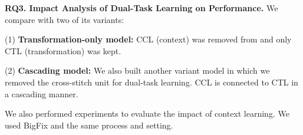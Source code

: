 



\vspace{2pt}
{\bf RQ3. Impact Analysis of Dual-Task Learning on Performance.}
We compare {\tool} with two of its variants:

(1) \textbf{Transformation-only model:}
CCL (context) was removed from {\tool} and only CTL (transformation)
was kept.


(2) \textbf{Cascading model:} We also built another variant model in
which we removed the cross-stitch unit for dual-task learning. CCL is
connected to CTL in a cascading manner.

We also performed experiments to evaluate the impact of context
learning. We used BigFix and the same process and setting.



